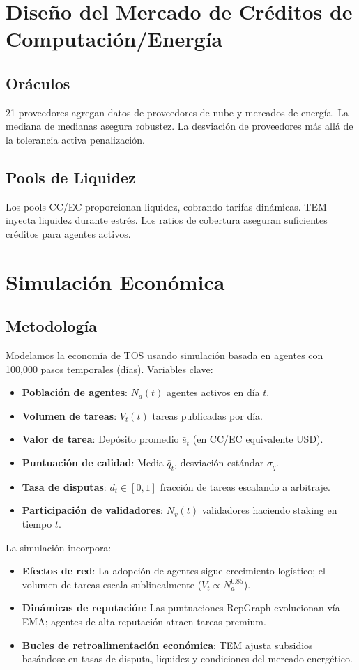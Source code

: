 \documentclass[11pt]{article}
\begin{document}
\section{Diseño del Mercado de Créditos de Computación/Energía}
\subsection{Oráculos}
21 proveedores agregan datos de proveedores de nube y mercados de energía. La mediana de medianas asegura robustez. La desviación de proveedores más allá de la tolerancia activa penalización.

\subsection{Pools de Liquidez}
Los pools CC/EC proporcionan liquidez, cobrando tarifas dinámicas. TEM inyecta liquidez durante estrés. Los ratios de cobertura aseguran suficientes créditos para agentes activos.

\section{Simulación Económica}
\label{sec:econ-sim}

\subsection{Metodología}
Modelamos la economía de TOS usando simulación basada en agentes con 100,000 pasos temporales (días). Variables clave:
\begin{itemize}[noitemsep]
  \item \textbf{Población de agentes}: $N_a(t)$ agentes activos en día $t$.
  \item \textbf{Volumen de tareas}: $V_t(t)$ tareas publicadas por día.
  \item \textbf{Valor de tarea}: Depósito promedio $\bar{e}_t$ (en CC/EC equivalente USD).
  \item \textbf{Puntuación de calidad}: Media $\bar{q}_t$, desviación estándar $\sigma_q$.
  \item \textbf{Tasa de disputas}: $d_t \in [0,1]$ fracción de tareas escalando a arbitraje.
  \item \textbf{Participación de validadores}: $N_v(t)$ validadores haciendo staking en tiempo $t$.
\end{itemize}
La simulación incorpora:
\begin{itemize}[noitemsep]
  \item \textbf{Efectos de red}: La adopción de agentes sigue crecimiento logístico; el volumen de tareas escala sublinealmente ($V_t \propto N_a^{0.85}$).
  \item \textbf{Dinámicas de reputación}: Las puntuaciones RepGraph evolucionan vía EMA; agentes de alta reputación atraen tareas premium.
  \item \textbf{Bucles de retroalimentación económica}: TEM ajusta subsidios basándose en tasas de disputa, liquidez y condiciones del mercado energético.
\end{itemize}
\end{document}
